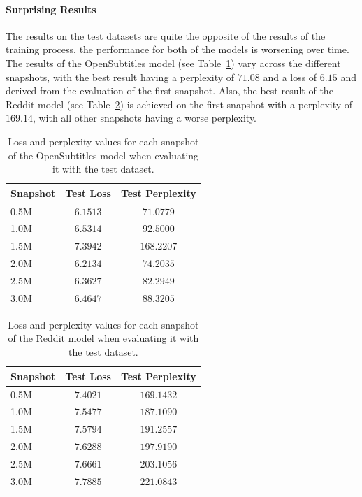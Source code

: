 \paragraph{Surprising Results} The results on the test datasets are quite the opposite of the results of the training process, the performance for both of the models is worsening over time. The results of the OpenSubtitles model (see Table~\ref{results:test_metrics:opensubtitles}) vary across the different snapshots, with the best result having a perplexity of $71.08$ and a loss of $6.15$ and derived from the evaluation of the first snapshot. Also, the best result of the Reddit model (see Table~\ref{results:test_metrics:reddit}) is achieved on the first snapshot with a perplexity of $169.14$, with all other snapshots having a worse perplexity.
\\
\begin{table}[H]
	\centering
	\begin{adjustbox}{max width=\textwidth}
		\begin{tabular}{l|cc}
			\toprule
			Snapshot & Test Loss & Test Perplexity\\
			\midrule
			0.5M & $6.1513$ & $71.0779$\\
			1.0M & $6.5314$ & $92.5000$\\
			1.5M & $7.3942$ & $168.2207$\\
			2.0M & $6.2134$ & $74.2035$\\
			2.5M & $6.3627$ & $82.2949$\\
			3.0M & $6.4647$ & $88.3205$\\
			\bottomrule
		\end{tabular}
	\end{adjustbox}
	\caption{Loss and perplexity values for each snapshot of the OpenSubtitles model when evaluating it with the test dataset.}
	\label{results:test_metrics:opensubtitles}
\end{table}

\begin{table}[H]
	\centering
	\begin{adjustbox}{max width=\textwidth}
		\begin{tabular}{l|cc}
			\toprule
			Snapshot & Test Loss & Test Perplexity\\
			\midrule
			0.5M & $7.4021$ & $169.1432$\\
			1.0M & $7.5477$ & $187.1090$\\
			1.5M & $7.5794$ & $191.2557$\\
			2.0M & $7.6288$ & $197.9190$\\
			2.5M & $7.6661$ & $203.1056$\\
			3.0M & $7.7885$ & $221.0843$\\
			\bottomrule
		\end{tabular}
	\end{adjustbox}
	\caption{Loss and perplexity values for each snapshot of the Reddit model when evaluating it with the test dataset.}
	\label{results:test_metrics:reddit}
\end{table}

